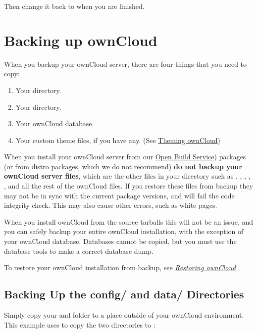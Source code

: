 \documentclass[letterpaper,10pt,english]{sphinxmanual}
\begin{document}
Then change it back to  when you are finished.


\section{Backing up ownCloud}
\label{maintenance/backup:backing-up-owncloud}\label{maintenance/backup::doc}
When you backup your ownCloud server, there are four things that you need to copy:
\begin{enumerate}
\item {} 
Your  directory.

\item {} 
Your  directory.

\item {} 
Your ownCloud database.

\item {} 
Your custom theme files, if you have any. (See \href{https://doc.owncloud.org/server/9.2/developer\_manual/core/theming.html}{Theming ownCloud})

\end{enumerate}

When you install your ownCloud server from our \href{https://download.owncloud.org/download/repositories/stable/owncloud/}{Open Build Service}) packages (or from distro packages, which we do not recommend) \textbf{do not backup your ownCloud server files}, which are the other files in your  directory such as , , , , , and all the rest of the ownCloud files. If you restore these files from backup they may not be in sync with the current package versions, and will fail the code integrity check. This may also cause other errors, such as white pages.

When you install ownCloud from the source tarballs this will not be an issue, and you can safely backup your entire ownCloud installation, with the exception of your ownCloud database. Databases cannot be copied, but you must use the database tools to make a correct database dump.

To restore your ownCloud installation from backup, see {\hyperref[maintenance/restore::doc]{\emph{\emph{Restoring ownCloud}}}} .


\subsection{Backing Up the config/ and data/ Directories}
\label{maintenance/backup:backing-up-the-config-and-data-directories}
Simply copy your  and  folder to a place outside of your ownCloud environment. This example uses  to copy the two directories to :
\end{document}
